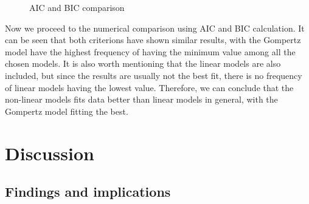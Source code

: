 \documentclass[11pt, oneside]{article}
\begin{document}
\begin{figure}[H]
\begin{center}
\begin{minipage}{.5\textwidth}
			\end{minipage}
			\end{center}
		\caption{AIC and BIC comparison}
		\end{figure}
		
		\noindent Now we proceed to the numerical comparison using AIC and BIC calculation. It can be seen that both criterions have shown similar results, with the Gompertz model have the highest frequency of having the minimum value among all the chosen models. It is also worth mentioning that the linear models are also included, but since the results are usually not the best fit, there is no frequency of linear models having the lowest value. Therefore, we can conclude that the non-linear models fits data better than linear models in general, with the Gompertz model fitting the best.

	\pagebreak
	\section{Discussion}
	
	\subsection{Findings and implications}
	
\end{document}
